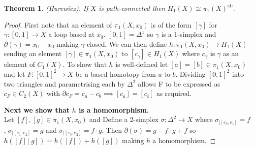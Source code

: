 \documentclass{report}
\newtheorem{theorem}{Theorem}
\begin{document}
\begin{theorem}
(Hurewicz). If $X$ is path-connected then $H_1(X)\cong\pi_1(X)^{\text{ab}}$.
\end{theorem}
\begin{proof}
First note that an element of $\pi_1(X,x_0)$ is of the form $[\gamma]$ for $\gamma\colon [0,1]\to X$ a loop based at $x_0$. $[0,1]=\Delta^1$ so $\gamma$ is a 1-simplex and $\partial(\gamma)=x_0-x_0$ making $\gamma$ closed.
We can then define $h\colon\pi_1(X,x_0)\to H_1(X)$ sending an element $[\gamma]\in\pi_1(X,x_0)$ to $[c_\gamma]\in H_1(X)$ where $c_\gamma$ is $\gamma$ as an element of $C_1(X)$. To show that $h$ is well-defined let $[a]=[b]\in\pi_1(X,x_0)$ and let $F\colon [0,1]^2\to X$ be a based-homotopy from $a$ to $b$. Dividing $[0,1]^2$ into two triangles and parametrising each by $\Delta^2$ allows F to be expressed as $c_F\in C_2(X)$ with $\partial c_F=c_a-c_b\implies [c_a]=[c_b]$ as required.

\noindent \textbf{Next we show that $h$ is a homomorphism.}\\
Let $[f],[g]\in\pi_1(X,x_0)$ and Define a 2-simplex $\sigma\colon\Delta^2\to X$ where $\sigma_{|[e_0,e_1]}=f$, $\sigma_{|[e_1,e_2]}=g$ and $\sigma_{|[e_0,e_2]}=f\cdot g$. Then $\partial(\sigma)=g-f\cdot g+f$ so $h([f][g])=h([f])+h([g])$ making $h$ a homomorphism.


\end{proof}
\end{document}
